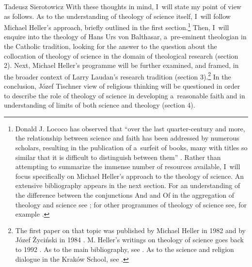 \begin{artengenv}{Tadeusz Sierotowicz}
With these thoughts in mind, I~will state my point of view as follows. As to the understanding of theology of science itself, I~will follow Michael Heller's approach, briefly outlined in the first section.\footnote{Donald J. Lococo has observed that ``over the last quarter-century and more, the relationship between science and faith has been addressed by numerous scholars, resulting in the publication of a~surfeit of books, many with titles so similar that it is difficult to distinguish between them'' 
\parencite[][p.10]{lococo_life_2021}. %
 Rather than attempting to summarize the immense number of resources available, I~will focus specifically on Michael Heller's approach to the theology of science. An extensive bibliography appears in the next section. For an understanding of the difference between the conjunctions And and Of in the aggregation of theology and science see 
\parencite[][pp.1–4]{tyson_christian_2022}; %
 for other programmes of theology of science see, for example 
\parencites[][]{lococo_towards_2002}[][]{lococo_life_2021}[][]{rodzen_teologia_2021}[][]{tyson_christian_2022}[][]{wilkinson_after_2022}.%
} Then, I~will enquire into the theology of Hans Urs von Balthasar, a~pre-eminent theologian in the Catholic tradition, looking for the answer to the question about the collocation of theology of science in the domain of theological research (section 2). Next, Michael Heller's programme will be further examined, and framed, in the broader context of Larry Laudan's research tradition (section 3).\footnote{The first paper on that topic was published by Michael Heller in 1982 and by Józef Życiński in 1984 
\parencites[][]{heller_stworzenie_1982}[][]{zycinski_w_1984}[see][]{polak_teologia_2015}[][]{rodzen_teologia_2021}. %
 M. Heller's writings on theology of science goes back to 1992 
\parencite[for an overview se][pp.759–760]{oleksowicz_we_2020}. %
 As to the main bibliography, see 
\parencites[][]{heller_new_1996}[][]{maczka_wstep_2015}[][]{macek_teologia_2014}[][]{maczka_teologia_2015}[][]{maziarka_w_2016}[][]{polak_teologia_2016}[][]{oleksowicz_we_2020}[][]{rodzen_teologia_2021}. %
 As to the science and religion dialogue in the Kraków School, see 
\parencites[][]{brozek_science_2015}[][]{obolevitch_relationship_2015}[][]{polak_science-religion_2021}[][]{polak_theory_2023}.%
} In the conclusion, Józef Tischner view of religious thinking will be questioned in order to describe the role of theology of science in developing a~reasonable faith and in understanding of limits of both science and theology (section 4).




\end{artengenv}

